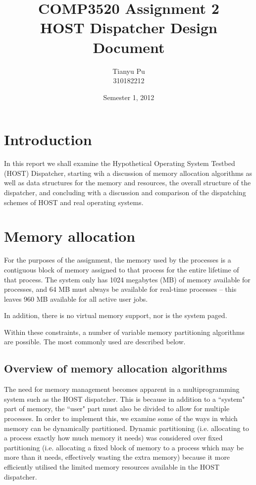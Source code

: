 \documentclass[12pt]{article}
\title{COMP3520 Assignment 2\\
  HOST Dispatcher Design Document}
\author{Tianyu Pu\\
  310182212}
\date{Semester 1, 2012}
\begin{document}
\maketitle

\section{Introduction}
In this report we shall examine the Hypothetical Operating System Testbed
(HOST) Dispatcher, starting wih a discussion of memory allocation
algorithms as well as data structures for the memory and resources, the overall
structure of the dispatcher, and concluding with a discussion and comparison
of the dispatching schemes of HOST and real operating systems.

\section{Memory allocation}
For the purposes of the assignment, the memory used by the processes is a
contiguous block of memory assigned to that process for the entire lifetime of
that process. The system only has 1024 megabytes (MB) of memory available for
processes, and 64 MB must always be available for real-time processes -- this
leaves 960 MB available for all active user jobs.

In addition, there is no virtual memory support, nor is the system paged.

Within these constraints, a number of variable memory partitioning algorithms
are possible. The most commonly used are described below.

\subsection{Overview of memory allocation algorithms}
The need for memory management becomes apparent in a multiprogramming system
such as the HOST dispatcher. This is because in addition to a ``system" part
of memory, the ``user" part must also be divided to allow for multiple
processes. In order to implement this, we examine some of the ways in which
memory can be dynamically partitioned. Dynamic partitioning (i.e. allocating
to a process exactly how much memory it needs) was considered over
fixed partitioning (i.e. allocating a fixed block of memory to a process which
may be more than it needs, effectively wasting the extra memory) because it
more efficiently utilised the limited memory resources available in the HOST
dispatcher.
\end{document}

